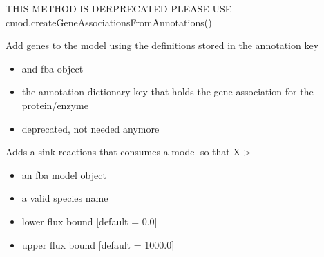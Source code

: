 \documentclass[letterpaper,10pt,english]{sphinxmanual}
\begin{document}
\begin{fulllineitems}
\label{\detokenize{modules_doc:cbmpy.CBTools.addGenesFromAnnotations}}
\pysigstartsignatures
{}
\pysigstopsignatures
\sphinxAtStartPar
THIS METHOD IS DERPRECATED PLEASE USE cmod.createGeneAssociationsFromAnnotations()

\sphinxAtStartPar
Add genes to the model using the definitions stored in the annotation key
\begin{itemize}
\item {} 
\sphinxAtStartPar
{} and fba object

\item {} 
\sphinxAtStartPar
{} the annotation dictionary key that holds the gene association for the protein/enzyme

\item {} 
\sphinxAtStartPar
{} deprecated, not needed anymore

\end{itemize}

\end{fulllineitems}


\begin{fulllineitems}
\label{\detokenize{modules_doc:cbmpy.CBTools.addSinkReaction}}
\pysigstartsignatures
{}
\pysigstopsignatures
\sphinxAtStartPar
Adds a sink reactions that consumes a model  so that X \textendash{}\textgreater{}
\begin{itemize}
\item {} 
\sphinxAtStartPar
{} an fba model object

\item {} 
\sphinxAtStartPar
{} a valid species name

\item {} 
\sphinxAtStartPar
{} lower flux bound {[}default = 0.0{]}

\item {} 
\sphinxAtStartPar
{} upper flux bound {[}default = 1000.0{]}

\end{itemize}

\end{fulllineitems}
\end{document}

